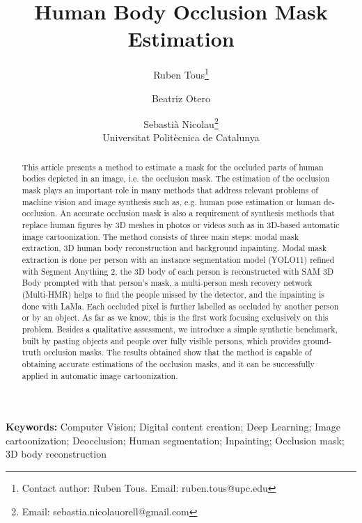\documentclass[11pt,a4paper]{article}
\title{Human Body Occlusion Mask Estimation}
\author{Ruben Tous\thanks{Contact author: Ruben Tous. Email: ruben.tous@upc.edu} \and Beatriz Otero \and Sebasti\`a Nicolau\thanks{Email: sebastia.nicolauorell@gmail.com}\\[0.5ex]
\small Universitat Polit\`ecnica de Catalunya}
\date{}
\begin{document}
\maketitle

\begin{abstract}
This article presents a method to estimate a mask for the occluded parts of human bodies depicted in an image, i.e. the occlusion mask. The
estimation of the occlusion mask plays an important role in many methods
that address relevant problems of machine vision and image synthesis
such as, e.g. human pose estimation or human de-occlusion. An accurate
occlusion mask is also a requirement of synthesis methods that replace
human figures by 3D meshes in photos or videos such as in 3D-based
automatic image cartoonization. The method consists of three main steps:
modal mask extraction, 3D human body reconstruction and background
inpainting. Modal mask extraction is done per person with an instance segmentation model (YOLO11) refined with Segment Anything 2, the 3D body of each person is reconstructed with SAM 3D Body prompted with that person's mask, a multi-person mesh recovery network (Multi-HMR) helps to find the people missed by the detector, and the inpainting is done with LaMa. Each occluded pixel is further labelled as occluded by another person or by an object. As far as we know, this is the
first work focusing exclusively on this problem. Besides a qualitative assessment, we introduce a simple synthetic benchmark, built by pasting objects and people over fully visible persons, which provides ground-truth occlusion masks. The results obtained
show that the method is capable of obtaining accurate estimations of the
occlusion masks, and it can be successfully applied in automatic image
cartoonization.
\end{abstract}

\noindent\textbf{Keywords:} Computer Vision; Digital content creation; Deep Learning; Image cartoonization; Deocclusion; Human segmentation; Inpainting; Occlusion mask; 3D body reconstruction

\end{document}
